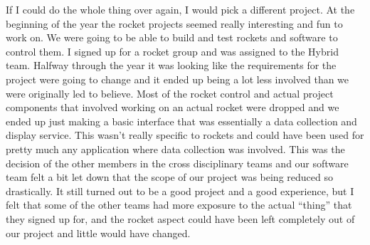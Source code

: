 \documentclass[10pt,draftclsnofoot,onecolumn,retainorgcmds]{IEEEtran}
\begin{document}
If I could do the whole thing over again, I would pick a different project. At the beginning of the year the rocket projects seemed really interesting and fun to work on. We were going to be able to build and test rockets and software to control them. I signed up for a rocket group and was assigned to the Hybrid team. Halfway through the year it was looking like the requirements for the project were going to change and it ended up being a lot less involved than we were originally led to believe. Most of the rocket control and actual project components that involved working on an actual rocket were dropped and we ended up just making a basic interface that was essentially a data collection and display service. This wasn’t really specific to rockets and could have been used for pretty much any application where data collection was involved. This was the decision of the other members in the cross disciplinary teams and our software team felt a bit let down that the scope of our project was being reduced so drastically. It still turned out to be a good project and a good experience, but I felt that some of the other teams had more exposure to the actual “thing” that they signed up for, and the rocket aspect could have been left completely out of our project and little would have changed. \par
\end{document}
